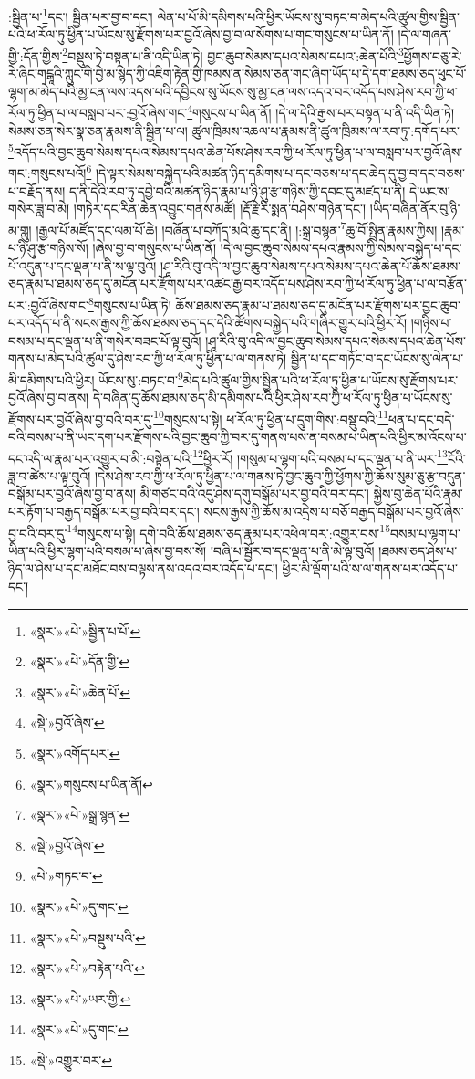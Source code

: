 :སྦྱིན་པ་\footnote{«སྣར་»«པེ་»སྦྱིན་པ་པོ་}དང་། སྦྱིན་པར་བྱ་བ་དང་། ལེན་པ་པོ་མི་དམིགས་པའི་ཕྱིར་ཡོངས་སུ་བཏང་བ་མེད་པའི་ཚུལ་གྱིས་སྦྱིན་པའི་ཕ་རོལ་ཏུ་ཕྱིན་པ་ཡོངས་སུ་རྫོགས་པར་བྱའོ་ཞེས་བྱ་བ་ལ་སོགས་པ་གང་གསུངས་པ་ཡིན་ནོ། །དེ་ལ་གཞན་གྱི་:དོན་གྱིས་\footnote{«སྣར་»«པེ་»དོན་གྱི་}བསྡུས་ཏེ་བསྟན་པ་ནི་འདི་ཡིན་ཏེ། བྱང་ཆུབ་སེམས་དཔའ་སེམས་དཔའ་:ཆེན་པོའི་\footnote{«སྣར་»«པེ་»ཆེན་པོ་}ཕྱོགས་བཅུ་རེ་རེ་ཞིང་གངྒཱའི་ཀླུང་གི་བྱེ་མ་སྙེད་ཀྱི་འཇིག་རྟེན་གྱི་ཁམས་ན་སེམས་ཅན་གང་ཞིག་ཡོད་པ་དེ་དག་ཐམས་ཅད་ཕུང་པོ་ལྷག་མ་མེད་པའི་མྱ་ངན་ལས་འདས་པའི་དབྱིངས་སུ་ཡོངས་སུ་མྱ་ངན་ལས་འདའ་བར་འདོད་པས་ཤེས་རབ་ཀྱི་ཕ་རོལ་ཏུ་ཕྱིན་པ་ལ་བསླབ་པར་:བྱའོ་ཞེས་གང་\footnote{«སྡེ་»བྱའོ་ཞེས་}གསུངས་པ་ཡིན་ནོ། །དེ་ལ་དེའི་རྒྱས་པར་བསྟན་པ་ནི་འདི་ཡིན་ཏེ། སེམས་ཅན་སེར་སྣ་ཅན་རྣམས་ནི་སྦྱིན་པ་ལ། ཚུལ་ཁྲིམས་འཆལ་པ་རྣམས་ནི་ཚུལ་ཁྲིམས་ལ་རབ་ཏུ་:དགོད་པར་\footnote{«སྣར་»འགོད་པར་}འདོད་པའི་བྱང་ཆུབ་སེམས་དཔའ་སེམས་དཔའ་ཆེན་པོས་ཤེས་རབ་ཀྱི་ཕ་རོལ་ཏུ་ཕྱིན་པ་ལ་བསླབ་པར་བྱའོ་ཞེས་གང་:གསུངས་པའོ།\footnote{«སྣར་»གསུངས་པ་ཡིན་ནོ།} །དེ་ལྟར་སེམས་བསྐྱེད་པའི་མཚན་ཉིད་དམིགས་པ་དང་བཅས་པ་དང་ཆེད་དུ་བྱ་བ་དང་བཅས་པ་བརྗོད་ནས། ད་ནི་དེའི་རབ་ཏུ་དབྱེ་བའི་མཚན་ཉིད་རྣམ་པ་ཉི་ཤུ་རྩ་གཉིས་ཀྱི་དབང་དུ་མཛད་པ་ནི། དེ་ཡང་ས་གསེར་ཟླ་བ་མེ། །གཏེར་དང་རིན་ཆེན་འབྱུང་གནས་མཚོ། །རྡོ་རྗེ་རི་སྨན་བཤེས་གཉེན་དང་། །ཡིད་བཞིན་ནོར་བུ་ཉི་མ་གླུ། །རྒྱལ་པོ་མཛོད་དང་ལམ་པོ་ཆེ། །བཞོན་པ་བཀོད་མའི་ཆུ་དང་ནི། །:སྒྲ་བསྙན་\footnote{«སྣར་»«པེ་»སྒྲ་སྙན་}ཆུ་བོ་སྤྲིན་རྣམས་ཀྱིས། །རྣམ་པ་ཉི་ཤུ་རྩ་གཉིས་སོ། །ཞེས་བྱ་བ་གསུངས་པ་ཡིན་ནོ། །དེ་ལ་བྱང་ཆུབ་སེམས་དཔའ་རྣམས་ཀྱི་སེམས་བསྐྱེད་པ་དང་པོ་འདུན་པ་དང་ལྡན་པ་ནི་ས་ལྟ་བུའོ། །ཤཱ་རིའི་བུ་འདི་ལ་བྱང་ཆུབ་སེམས་དཔའ་སེམས་དཔའ་ཆེན་པོ་ཆོས་ཐམས་ཅད་རྣམ་པ་ཐམས་ཅད་དུ་མངོན་པར་རྫོགས་པར་འཚང་རྒྱ་བར་འདོད་པས་ཤེས་རབ་ཀྱི་ཕ་རོལ་ཏུ་ཕྱིན་པ་ལ་བརྩོན་པར་:བྱའོ་ཞེས་གང་\footnote{«སྡེ་»བྱའོ་ཞེས་}གསུངས་པ་ཡིན་ཏེ། ཆོས་ཐམས་ཅད་རྣམ་པ་ཐམས་ཅད་དུ་མངོན་པར་རྫོགས་པར་བྱང་ཆུབ་པར་འདོད་པ་ནི་སངས་རྒྱས་ཀྱི་ཆོས་ཐམས་ཅད་དང་དེའི་ཚོགས་བསྐྱེད་པའི་གཞིར་གྱུར་པའི་ཕྱིར་རོ། །གཉིས་པ་བསམ་པ་དང་ལྡན་པ་ནི་གསེར་བཟང་པོ་ལྟ་བུའོ། །ཤཱ་རིའི་བུ་འདི་ལ་བྱང་ཆུབ་སེམས་དཔའ་སེམས་དཔའ་ཆེན་པོས་གནས་པ་མེད་པའི་ཚུལ་དུ་ཤེས་རབ་ཀྱི་ཕ་རོལ་ཏུ་ཕྱིན་པ་ལ་གནས་ཏེ། སྦྱིན་པ་དང་གཏོང་བ་དང་ཡོངས་སུ་ལེན་པ་མི་དམིགས་པའི་ཕྱིར། ཡོངས་སུ་:བཏང་བ་\footnote{«པེ་»གཏང་བ་}མེད་པའི་ཚུལ་གྱིས་སྦྱིན་པའི་ཕ་རོལ་ཏུ་ཕྱིན་པ་ཡོངས་སུ་རྫོགས་པར་བྱའོ་ཞེས་བྱ་བ་ནས། དེ་བཞིན་དུ་ཆོས་ཐམས་ཅད་མི་དམིགས་པའི་ཕྱིར་ཤེས་རབ་ཀྱི་ཕ་རོལ་ཏུ་ཕྱིན་པ་ཡོངས་སུ་རྫོགས་པར་བྱའོ་ཞེས་བྱ་བའི་བར་དུ་\footnote{«སྣར་»«པེ་»དུ་གང་}གསུངས་པ་སྟེ། ཕ་རོལ་ཏུ་ཕྱིན་པ་དྲུག་གིས་:བསྡུ་བའི་\footnote{«སྣར་»«པེ་»བསྡུས་པའི་}ཕན་པ་དང་བདེ་བའི་བསམ་པ་ནི་ཡང་དག་པར་རྫོགས་པའི་བྱང་ཆུབ་ཀྱི་བར་དུ་གནས་པས་ན་བསམ་པ་ཡིན་པའི་ཕྱིར་མ་འོངས་པ་དང་འདི་ལ་རྣམ་པར་འགྱུར་བ་མི་:བསྟེན་པའི་\footnote{«སྣར་»«པེ་»བརྟེན་པའི་}ཕྱིར་རོ། །གསུམ་པ་ལྷག་པའི་བསམ་པ་དང་ལྡན་པ་ནི་ཡར་\footnote{«སྣར་»«པེ་»ཡར་གྱི་}ངོའི་ཟླ་བ་ཚེས་པ་ལྟ་བུའོ། །དེས་ཤེས་རབ་ཀྱི་ཕ་རོལ་ཏུ་ཕྱིན་པ་ལ་གནས་ཏེ་བྱང་ཆུབ་ཀྱི་ཕྱོགས་ཀྱི་ཆོས་སུམ་ཅུ་རྩ་བདུན་བསྒོམ་པར་བྱའོ་ཞེས་བྱ་བ་ནས། མི་གཙང་བའི་འདུ་ཤེས་དགུ་བསྒོམ་པར་བྱ་བའི་བར་དང་། སྐྱེས་བུ་ཆེན་པོའི་རྣམ་པར་རྟོག་པ་བརྒྱད་བསྒོམ་པར་བྱ་བའི་བར་དང་། སངས་རྒྱས་ཀྱི་ཆོས་མ་འདྲེས་པ་བཅོ་བརྒྱད་བསྒོམ་པར་བྱའོ་ཞེས་བྱ་བའི་བར་དུ་\footnote{«སྣར་»«པེ་»དུ་གང་}གསུངས་པ་སྟེ། དགེ་བའི་ཆོས་ཐམས་ཅད་རྣམ་པར་འཕེལ་བར་:འགྱུར་བས་\footnote{«སྡེ་»འགྱུར་བར་}བསམ་པ་ལྷག་པ་ཡིན་པའི་ཕྱིར་ལྷག་པའི་བསམ་པ་ཞེས་བྱ་བས་སོ། །བཞི་པ་སྦྱོར་བ་དང་ལྡན་པ་ནི་མེ་ལྟ་བུའོ། །ཐམས་ཅད་ཤེས་པ་ཉིད་ལ་ཤེས་པ་དང་མཐོང་བས་བལྟས་ནས་འདའ་བར་འདོད་པ་དང་། ཕྱིར་མི་ལྡོག་པའི་ས་ལ་གནས་པར་འདོད་པ་དང་། 